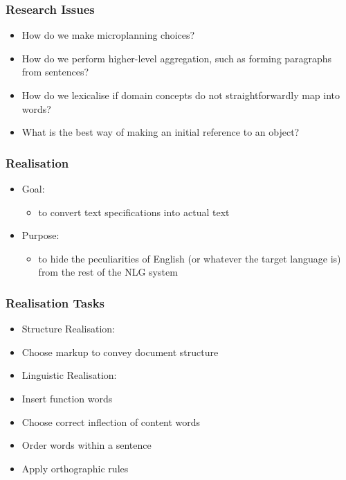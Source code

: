 \documentclass[compress,color=usenames]{beamer}
\begin{document}
\begin{frame}
\frametitle{
Research Issues}

\label{f21}
\begin{itemize}
\item {{How do we make microplanning choices?}}
\item {{How do we perform higher-level aggregation, such as forming paragraphs from sentences?}}
\item {{How do we lexicalise if domain concepts do not straightforwardly map into words?}}
\item {{What is the best way of making an initial reference to an object?}}
\end{itemize}
\end{frame}

\begin{frame}
\frametitle{
Realisation}

\label{f23}
\begin{itemize}
\item {{Goal: }}
\begin{itemize}
\item to convert text specifications into actual text
\end{itemize}
\item {{Purpose: }}
\begin{itemize}
\item to hide the peculiarities of English (or whatever the target language is) from the rest of the NLG system
\end{itemize}
\end{itemize}
\end{frame}

\begin{frame}
\frametitle{
Realisation Tasks}

\label{f25}
\begin{itemize}
\item {{Structure Realisation:}}
\item {{Choose markup to convey document structure }}
\item {{Linguistic Realisation:}}
\item {{Insert function words}}
\item {{Choose correct inflection of content words}}
\item {{Order words within a sentence}}
\item {{Apply orthographic rules}}
\end{itemize}
\end{frame}
\end{document}
